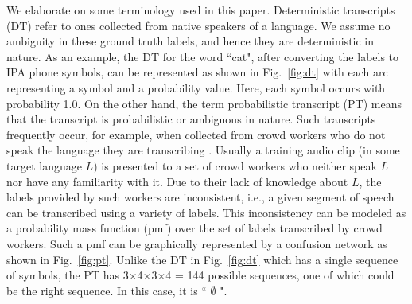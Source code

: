 \documentclass[a4paper]{article}
\begin{document}
We elaborate on some terminology used in this paper. Deterministic transcripts (DT) refer to ones collected from native speakers of a language. We assume no ambiguity in these ground truth labels, and hence they are deterministic in nature. As an example, the DT for the word ``cat", after converting the labels to IPA phone symbols, can be represented as shown in Fig.~\ref{fig:dt} with each arc representing a symbol and a probability value. Here, each symbol occurs with probability 1.0. On the other hand, the term probabilistic transcript (PT) means that the transcript is probabilistic or ambiguous in nature. Such transcripts frequently occur, for example, when collected from crowd workers who do not speak the language they are transcribing \cite{Jyothi-MismatchedCrowdsourcingTrans}. Usually a training audio clip (in some target language $L$) is presented to a set of crowd workers who neither speak $L$ nor have any familiarity with it. Due to their lack of knowledge about $L$, the labels provided by such workers are inconsistent, i.e., a given segment of speech can be transcribed using a variety of labels. This inconsistency can be modeled as a probability mass function (pmf) over the set of labels transcribed by crowd workers. Such a pmf can be graphically represented by a confusion network as shown in Fig.~\ref{fig:pt}. Unlike the DT in Fig.~\ref{fig:dt} which has a single sequence of symbols, the PT has 3$\times$4$\times$3$\times$4 = 144 possible sequences, one of which could be the right sequence. In this case, it is `` \ipa{\ae} $\emptyset$ ".

\end{document}
